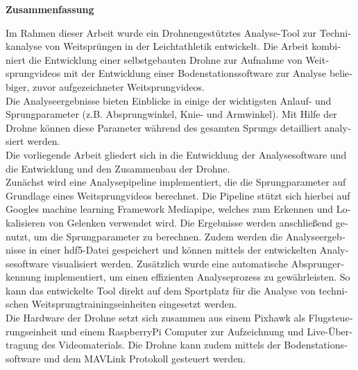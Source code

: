 \newpage
\thispagestyle{empty}
\begin{otherlanguage}{german}
\vspace*{\fill}
\begin{center}
        \textbf{Zusammenfassung}
\end{center}
Im Rahmen dieser Arbeit wurde ein Drohnengestütztes Analyse-Tool zur
Technikanalyse von Weitsprüngen in der Leichtathletik entwickelt.
Die Arbeit kombiniert die Entwicklung einer selbstgebauten Drohne zur Aufnahme
von Weitsprungvideos mit der Entwicklung einer Bodenstationssoftware zur
Analyse beliebiger, zuvor aufgezeichneter Weitsprungvideos.\\
Die Analyseergebnisse bieten Einblicke in einige der wichtigsten Anlauf- und
Sprungparameter (z.B. Absprungwinkel, Knie- und Armwinkel).
Mit Hilfe der Drohne können diese Parameter während des gesamten Sprungs
detailliert analysiert werden.\\
Die vorliegende Arbeit gliedert sich in die Entwicklung der Analysesoftware
und die Entwicklung und den Zusammenbau der Drohne.\\
Zunächst wird eine Analysepipeline implementiert, die die Sprungparameter
auf Grundlage eines Weitsprungvideos berechnet.
Die Pipeline stützt sich hierbei auf Googles machine learning
Framework Mediapipe, welches zum Erkennen und Lokalisieren von Gelenken
verwendet wird.
Die Ergebnisse werden anschließend genutzt, um die Sprungparameter zu
berechnen.
Zudem werden die Analyseergebnisse in einer hdf5-Datei gespeichert und
können mittels der entwickelten Analysesoftware visualisiert werden.
Zusätzlich wurde eine automatische Absprungerkennung implementiert, um einen
effizienten Analyseprozess zu gewährleisten.
So kann das entwickelte Tool direkt auf dem Sportplatz für die Analyse von
technischen Weitsprungtrainingseinheiten eingesetzt werden.\\
Die Hardware der Drohne setzt sich zusammen aus einem Pixhawk als
Flugsteuerungseinheit und einem RaspberryPi Computer zur Aufzeichnung und
Live-Übertragung des Videomaterials.
Die Drohne kann zudem mittels der Bodenstationssoftware und dem MAVLink
Protokoll gesteuert werden.
\vfill
\end{otherlanguage}

